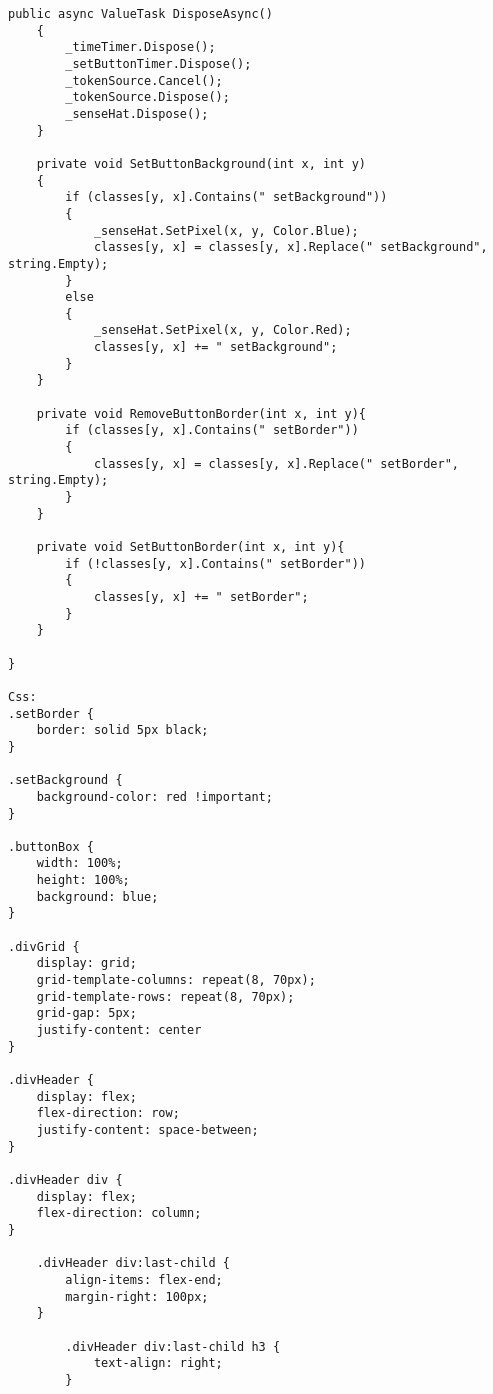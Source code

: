 \begin{lstlisting}[language={[Sharp]C}, caption=Kompletter Demo Code,
	label=lst:DemoCode]
    public async ValueTask DisposeAsync()
    {
        _timeTimer.Dispose();
        _setButtonTimer.Dispose();
        _tokenSource.Cancel();
        _tokenSource.Dispose();
        _senseHat.Dispose();
    }

    private void SetButtonBackground(int x, int y)
    {
        if (classes[y, x].Contains(" setBackground"))
        {
            _senseHat.SetPixel(x, y, Color.Blue);
            classes[y, x] = classes[y, x].Replace(" setBackground", string.Empty);
        }
        else
        {
            _senseHat.SetPixel(x, y, Color.Red);
            classes[y, x] += " setBackground";
        }
    }

    private void RemoveButtonBorder(int x, int y){
        if (classes[y, x].Contains(" setBorder"))
        {
            classes[y, x] = classes[y, x].Replace(" setBorder", string.Empty);
        }
    }

    private void SetButtonBorder(int x, int y){
        if (!classes[y, x].Contains(" setBorder"))
        {
            classes[y, x] += " setBorder";
        }
    }

}

Css:
.setBorder {
    border: solid 5px black;
}

.setBackground {
    background-color: red !important;
}

.buttonBox {
    width: 100%;
    height: 100%;
    background: blue;
}

.divGrid {
    display: grid;
    grid-template-columns: repeat(8, 70px);
    grid-template-rows: repeat(8, 70px);
    grid-gap: 5px;
    justify-content: center
}

.divHeader {
    display: flex;
    flex-direction: row;
    justify-content: space-between;
}

.divHeader div {
    display: flex;
    flex-direction: column;
}

    .divHeader div:last-child {
        align-items: flex-end;
        margin-right: 100px;
    }

        .divHeader div:last-child h3 {
            text-align: right;
        }

\end{lstlisting}
